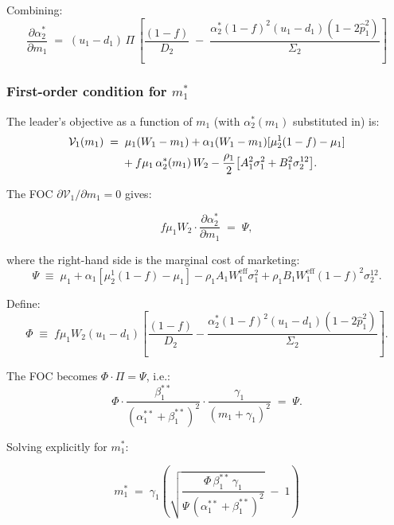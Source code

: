 \documentclass[12pt,a4paper]{article}
\newcommand{\1}{\mathbf{1}}
\begin{document}
Combining:
\begin{equation}
  \boxed{
    \frac{\partial \alpha_2^*}{\partial m_1}
    \;=\;
    (u_1-d_1)\,\Pi\,
    \left[
      \frac{(1-f)}{D_2}
      \;-\;
      \frac{\alpha_2^*(1-f)^2(u_1-d_1)(1-2\hat{p}_1^2)}{\Sigma_2}
    \right]
  }
  \label{eq:dalpha2_dm1}
\end{equation}

\subsubsection{First-order condition for $m_1^*$}

The leader's objective as a function of $m_1$ (with $\alpha_2^*(m_1)$ substituted in) is:
\begin{align}
  \mathcal{V}_1(m_1) \;=\;&\;
  \mu_1(W_1-m_1)
  + \alpha_1(W_1-m_1)[\mu_2^1(1-f)-\mu_1] \notag\\
  &+ f\mu_1\,\alpha_2^*(m_1)\,W_2
  - \frac{\rho_1}{2}\bigl[A_1^2\sigma_1^2 + B_1^2\sigma_2^{12}\bigr].
  \label{eq:V1_m1}
\end{align}

The FOC $\partial \mathcal{V}_1 / \partial m_1 = 0$ gives:

\begin{equation}
  f\mu_1 W_2 \cdot \frac{\partial \alpha_2^*}{\partial m_1}
  \;=\;
  \Psi,
  \label{eq:foc_m1}
\end{equation}

where the right-hand side is the marginal cost of marketing:
\begin{equation}
  \Psi \;\equiv\;
  \mu_1 + \alpha_1[\mu_2^1(1-f)-\mu_1]
  - \rho_1 A_1 W_1^{\mathrm{eff}}\sigma_1^2
  + \rho_1 B_1 W_1^{\mathrm{eff}}(1-f)^2\sigma_2^{12}.
  \label{eq:Psi}
\end{equation}

Define:
\begin{equation}
  \Phi \;\equiv\;
  f\mu_1 W_2(u_1-d_1)
  \left[
    \frac{(1-f)}{D_2}
    - \frac{\alpha_2^*(1-f)^2(u_1-d_1)(1-2\hat{p}_1^2)}{\Sigma_2}
  \right].
  \label{eq:Phi}
\end{equation}

The FOC becomes $\Phi \cdot \Pi = \Psi$, i.e.:
\[
  \Phi \cdot
  \frac{\beta_1^{**}}{(\alpha_1^{**}+\beta_1^{**})^2}
  \cdot
  \frac{\gamma_1}{(m_1+\gamma_1)^2}
  \;=\; \Psi.
\]

Solving explicitly for $m_1^*$:

\begin{equation}
  \boxed{
    m_1^* \;=\;
    \gamma_1 \!\left(
      \sqrt{\frac{\Phi\,\beta_1^{**}\,\gamma_1}{\Psi\,(\alpha_1^{**}+\beta_1^{**})^2}}
      \;-\; 1
    \right)
  }
  \label{eq:m1_star}
\end{equation}
\end{document}
